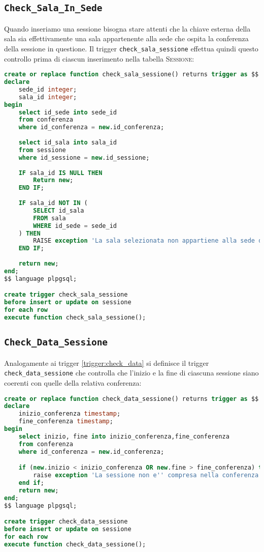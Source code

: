 \subsection{\texttt{Check\_Sala\_In\_Sede}}\label{trigger:salainsede}
Quando inseriamo una sessione bisogna stare attenti che la chiave esterna della sala sia effettivamente una sala appartenente alla sede che ospita la conferenza della sessione in questione. Il trigger \texttt{check\_sala\_sessione} effettua quindi questo controllo prima di ciascun inserimento nella tabella \textsc{Sessione}:
\begin{lstlisting}[language=SQL, style=mystyle]
create or replace function check_sala_sessione() returns trigger as $$
declare
    sede_id integer;
    sala_id integer;
begin
    select id_sede into sede_id
    from conferenza
    where id_conferenza = new.id_conferenza;
    
    select id_sala into sala_id
    from sessione
    where id_sessione = new.id_sessione;
    
    IF sala_id IS NULL THEN
        Return new;
    END IF;
    
    IF sala_id NOT IN (
        SELECT id_sala
        FROM sala
        WHERE id_sede = sede_id
    ) THEN
        RAISE exception 'La sala selezionata non appartiene alla sede della conferenza';
    END IF;
    
    return new;
end;
$$ language plpgsql;

create trigger check_sala_sessione
before insert or update on sessione
for each row
execute function check_sala_sessione();
\end{lstlisting}
\subsection{\texttt{Check\_Data\_Sessione}}\label{trigger:datasessione}
Analogamente ai trigger \ref{trigger:check_data} si definisce il trigger \texttt{check\_data\_sessione} che controlla che l'inizio e la fine di ciascuna sessione siano coerenti con quelle della relativa conferenza:
\begin{lstlisting}[language=SQL, style=mystyle, caption={\texttt{check\_data\_sessione}}]
create or replace function check_data_sessione() returns trigger as $$
declare
    inizio_conferenza timestamp;
    fine_conferenza timestamp;
begin
    select inizio, fine into inizio_conferenza,fine_conferenza
    from conferenza
    where id_conferenza = new.id_conferenza;

    if (new.inizio < inizio_conferenza OR new.fine > fine_conferenza) then
        raise exception 'La sessione non e'' compresa nella conferenza';
    end if;
    return new;
end;
$$ language plpgsql;

create trigger check_data_sessione
before insert or update on sessione
for each row
execute function check_data_sessione();
\end{lstlisting}
